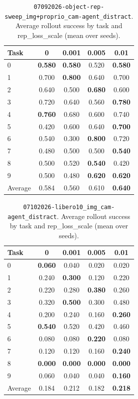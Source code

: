 \begin{table}
\caption{\texttt{07092026-object-rep-sweep\_img+proprio\_cam-agent\_distract}. Average rollout success by task and rep\_loss\_scale (mean over seeds).}
\label{tab:07092026_object_rep_sweep_img_proprio_cam_agent_distract_rep_loss_success}
\begin{tabular}{lcccc}
\toprule
Task & 0 & 0.001 & 0.005 & 0.01 \\
\midrule
0 & \textbf{0.580} & \textbf{0.580} & 0.520 & \textbf{0.580} \\
1 & 0.700 & \textbf{0.800} & 0.640 & 0.700 \\
2 & 0.640 & 0.500 & \textbf{0.680} & 0.600 \\
3 & 0.720 & 0.640 & 0.560 & \textbf{0.780} \\
4 & \textbf{0.760} & 0.680 & 0.600 & 0.740 \\
5 & 0.420 & 0.600 & 0.640 & \textbf{0.700} \\
6 & 0.540 & 0.300 & \textbf{0.800} & 0.720 \\
7 & 0.480 & 0.500 & 0.500 & \textbf{0.540} \\
8 & 0.500 & 0.520 & \textbf{0.540} & 0.420 \\
9 & 0.500 & 0.480 & \textbf{0.620} & \textbf{0.620} \\
\midrule
Average & 0.584 & 0.560 & 0.610 & \textbf{0.640} \\
\bottomrule
\end{tabular}
\end{table}



\begin{table}
\caption{\texttt{07102026-libero10\_img\_cam-agent\_distract}. Average rollout success by task and rep\_loss\_scale (mean over seeds).}
\label{tab:07102026_libero10_img_cam_agent_distract_rep_loss_success}
\begin{tabular}{lcccc}
\toprule
Task & 0 & 0.001 & 0.005 & 0.01 \\
\midrule
0 & \textbf{0.060} & 0.040 & 0.020 & 0.020 \\
1 & 0.240 & \textbf{0.300} & 0.120 & 0.220 \\
2 & 0.220 & 0.280 & \textbf{0.380} & 0.260 \\
3 & 0.320 & \textbf{0.500} & 0.300 & 0.480 \\
4 & 0.200 & 0.240 & 0.160 & \textbf{0.260} \\
5 & \textbf{0.540} & 0.520 & 0.420 & 0.460 \\
6 & 0.080 & 0.080 & \textbf{0.220} & 0.080 \\
7 & 0.120 & 0.120 & 0.160 & \textbf{0.240} \\
8 & \textbf{0.000} & \textbf{0.000} & \textbf{0.000} & \textbf{0.000} \\
9 & 0.060 & 0.040 & 0.040 & \textbf{0.160} \\
\midrule
Average & 0.184 & 0.212 & 0.182 & \textbf{0.218} \\
\bottomrule
\end{tabular}
\end{table}


